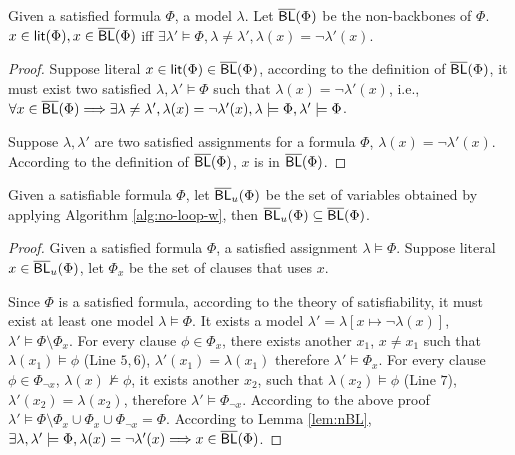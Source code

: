 \begin{lemma}
Given a satisfied formula $\Phi$, a model $\lambda$. Let $\overline{\textsf{BL}}(\Phi)$ be the non-backbones of $\Phi$.
$x\in\textsf{lit}(\Phi), x\in\overline{\textsf{BL}}(\Phi)$ iff $\exists\lambda'\models\Phi, \lambda\neq\lambda',
\lambda(x)=\neg\lambda'(x)$.
\end{lemma}\label{lem:nBL}
\begin{proof}
Suppose literal $x\in\textsf{lit}(\Phi)\in\overline{\textsf{BL}}(\Phi)$, according to the definition of $\overline{\textsf{BL}}(\Phi)$,
it must exist two satisfied $\lambda, \lambda'\models\Phi$
such that $\lambda(x)=\neg\lambda'(x)$, i.e.,
$\forall x\in\overline{\textsf{BL}}(\Phi)\Longrightarrow\exists \lambda\neq\lambda', \lambda(x)=\neg\lambda'(x), \lambda\models\Phi,\lambda'\models\Phi$.

Suppose $\lambda, \lambda'$ are two satisfied assignments for a formula $\Phi$,
$\lambda(x)=\neg\lambda'(x)$.
According to the definition of $\overline{\textsf{BL}}(\Phi)$, $x$ is in $\overline{\textsf{BL}}(\Phi)$.
\end{proof}

\begin{theorem}
Given a satisfiable formula $\Phi$, let $\overline{\textsf{BL}}_u(\Phi)$ be the set of variables obtained by applying Algorithm \ref{alg:no-loop-w}, then $\overline{\textsf{BL}}_u(\Phi)\subseteq\overline{\textsf{BL}}(\Phi)$.
\end{theorem}
\begin{proof}

Given a satisfied formula $\Phi$, a satisfied assignment $\lambda\models\Phi$.
Suppose literal $x\in \overline{\textsf{BL}}_u(\Phi)$, let $\Phi_{x}$ be the set of clauses that uses $x$.

Since $\Phi$ is a satisfied formula, according to the theory of satisfiability, it must exist at least one model $\lambda\models\Phi$. It exists a model $\lambda'=\lambda[x\mapsto\neg\lambda(x)]$, $\lambda'\models\Phi\setminus\Phi_{x}$.
For every clause $\phi\in\Phi_{x}$, there exists another ${x_1}$, $x\neq x_1$ such that $\lambda(x_1)\models\phi$ (Line $5,6$), $\lambda'(x_1)=\lambda(x_1)$ therefore $\lambda'\models\Phi_{x}$.
For every clause $\phi\in\Phi_{\neg x}$, $\lambda(x)\not\models\phi$, it exists another ${x_2}$, such that $\lambda(x_2)\models\phi$ (Line $7$), $\lambda'(x_2)=\lambda(x_2)$, therefore $\lambda'\models\Phi_{\neg x}$.
According to the above proof $\lambda'\models\Phi\setminus\Phi_{x}\cup\Phi_{x}\cup\Phi_{\neg x}=\Phi$.
According to Lemma \ref{lem:nBL}, $\exists \lambda, \lambda'\models\Phi, \lambda(x)=\neg \lambda'(x)\Longrightarrow x\in\overline{\textsf{BL}}(\Phi)$.
\end{proof}

